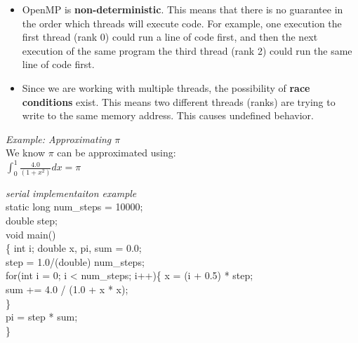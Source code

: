 \documentclass[10pt, AMS Euler]{article}
\begin{document}
\begin{itemize}
  \item OpenMP is \textbf{non-deterministic}. This means that there is no guarantee in the order which threads will execute code. For example, one execution the first thread (rank 0) could run a line of code first, and then the next execution of the same program the third thread (rank 2) could run the same line of code first.
  \item Since we are working with multiple threads, the possibility of \textbf{race conditions} exist. This means two different threads (ranks) are trying to write to the same memory address. This causes undefined behavior.
\end{itemize}

\textit{Example: Approximating $\pi$}\\
We know $\pi$ can be approximated using:\\
$ \int_0^1 \frac{4.0}{(1 + x^2)} dx = \pi $\\

\newpage

\textit{serial implementaiton example}\\

static long num\_steps = 10000;\\
double step;\\
void main()\\
\{ int i; double x, pi, sum = 0.0;\\
step = 1.0/(double) num\_steps;\\

for(int i = 0; i < num\_steps; i++)\{
  x = (i + 0.5) * step;\\
  sum += 4.0 / (1.0 + x * x);\\
\}\\
pi = step * sum;\\
\}\\
\end{document}
